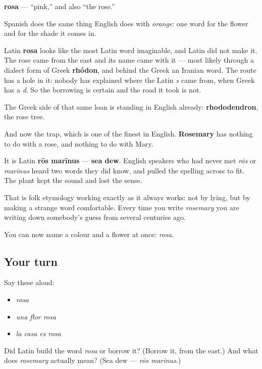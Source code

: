 \begin{cousinweb}
\textbf{rosa} — \textquotedblleft{}pink,\textquotedblright{} and also \textquotedblleft{}the rose.\textquotedblright{}

Spanish does the same thing English does with \emph{orange}: one word for the flower and for the shade it comes in.

Latin \textbf{rosa} looks like the most Latin word imaginable, and Latin did not make it. The rose came from the east and its name came with it — most likely through a dialect form of Greek \textbf{rhódon}, and behind the Greek an Iranian word. The route has a hole in it: nobody has explained where the Latin \emph{s} came from, when Greek has a \emph{d}. So the borrowing is certain and the road it took is not.

The Greek side of that same loan is standing in English already: \textbf{rhododendron}, the rose tree.

And now the trap, which is one of the finest in English. \textbf{Rosemary} has nothing to do with a rose, and nothing to do with Mary.

It is Latin \textbf{rōs marīnus} — \textbf{sea dew}. English speakers who had never met \emph{rōs} or \emph{marīnus} heard two words they did know, and pulled the spelling across to fit. The plant kept the sound and lost the sense.

That is folk etymology working exactly as it always works: not by lying, but by making a strange word comfortable. Every time you write \emph{rosemary} you are writing down somebody's guess from several centuries ago.
\end{cousinweb}

\begin{grammarlens}[title={What you've built}]
You can now name a colour and a flower at once: \emph{rosa}.
\end{grammarlens}

\subsection*{Your turn}
Say these aloud:

\begin{itemize}
\raggedright
  \item \emph{rosa}
  \item \emph{una flor rosa}
  \item \emph{la casa es rosa}
\end{itemize}

\begin{tcolorbox}[breakable,colback=teal!4,colframe=teal!35!black,title={Before you move on}]
Did Latin build the word \emph{rosa} or borrow it? (Borrow it, from the east.) And what does \emph{rosemary} actually mean? (Sea dew — \emph{rōs marīnus}.)
\end{tcolorbox}
